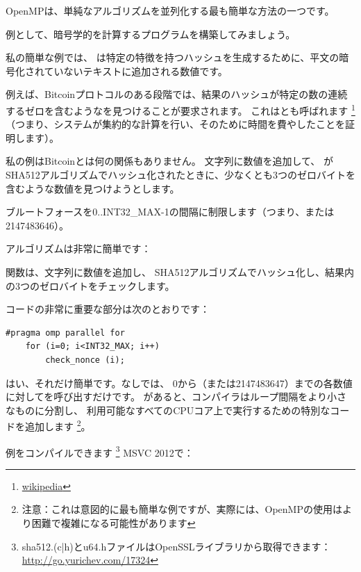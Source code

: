\label{openmp}

OpenMPは、単純なアルゴリズムを並列化する最も簡単な方法の一つです。


例として、暗号学的を計算するプログラムを構築してみましょう。

私の簡単な例では、
は特定の特徴を持つハッシュを生成するために、平文の暗号化されていないテキストに追加される数値です。

例えば、Bitcoinプロトコルのある段階では、結果のハッシュが特定の数の連続するゼロを含むようなを見つけることが要求されます。
これはとも呼ばれます
\footnote{\href{http://go.yurichev.com/17101}{wikipedia}}
（つまり、システムが集約的な計算を行い、そのために時間を費やしたことを証明します）。

私の例はBitcoinとは何の関係もありません。
文字列に数値を追加して、
がSHA512アルゴリズムでハッシュ化されたときに、少なくとも3つのゼロバイトを含むような数値を見つけようとします。

ブルートフォースを0..INT32\_MAX-1の間隔に制限します（つまり、または2147483646）。

アルゴリズムは非常に簡単です：



関数は、文字列に数値を追加し、
SHA512アルゴリズムでハッシュ化し、結果内の3つのゼロバイトをチェックします。

コードの非常に重要な部分は次のとおりです：

\begin{lstlisting}[style=customc]
	#pragma omp parallel for
	for (i=0; i<INT32_MAX; i++)
		check_nonce (i);
\end{lstlisting}

はい、それだけ簡単です。なしでは、
0から（または2147483647）までの各数値に対してを呼び出すだけです。
があると、コンパイラはループ間隔をより小さなものに分割し、
利用可能なすべての\ac{CPU}コア上で実行するための特別なコードを追加します
\footnote{注意：これは意図的に最も簡単な例ですが、実際には、OpenMPの使用はより困難で複雑になる可能性があります}。

例をコンパイルできます
\footnote{sha512.(c|h)とu64.hファイルはOpenSSLライブラリから取得できます：
\url{http://go.yurichev.com/17324}}
MSVC 2012で：

